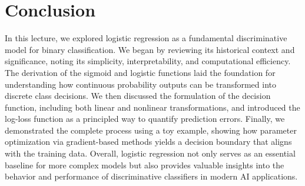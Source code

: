 \documentclass[12pt]{article}
\begin{document}
\section{Conclusion}
In this lecture, we explored logistic regression as a fundamental discriminative model for binary classification. We began by reviewing its historical context and significance, noting its simplicity, interpretability, and computational efficiency. The derivation of the sigmoid and logistic functions laid the foundation for understanding how continuous probability outputs can be transformed into discrete class decisions. We then discussed the formulation of the decision function, including both linear and nonlinear transformations, and introduced the log-loss function as a principled way to quantify prediction errors. Finally, we demonstrated the complete process using a toy example, showing how parameter optimization via gradient-based methods yields a decision boundary that aligns with the training data. Overall, logistic regression not only serves as an essential baseline for more complex models but also provides valuable insights into the behavior and performance of discriminative classifiers in modern AI applications.
\end{document}
